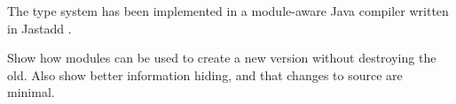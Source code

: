 The type system has been implemented in a module-aware Java
compiler written in Jastadd \cite{jastadd}.

Show how modules can be used to create a new version without
destroying the old. Also show better information hiding, and
that changes to source are minimal.